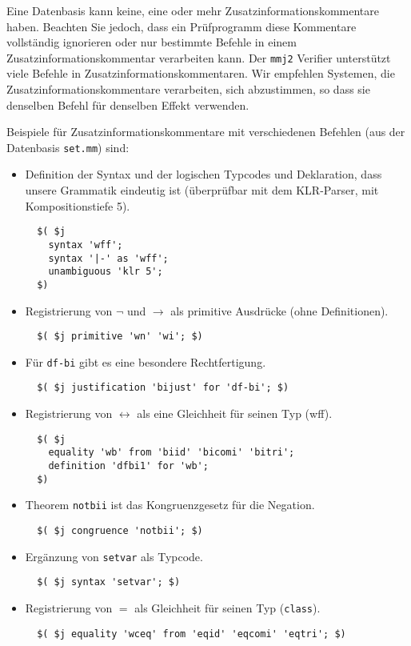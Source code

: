 Eine Datenbasis kann keine, eine oder mehr Zusatzinformationskommentare haben. Beachten Sie jedoch, dass ein Prüfprogramm diese Kommentare vollständig ignorieren oder nur bestimmte Befehle in einem Zusatzinformationskommentar verarbeiten kann. Der \texttt{mmj2} Verifier unterstützt viele Befehle in Zusatzinformationskommentaren. Wir empfehlen Systemen, die Zusatzinformationskommentare verarbeiten, sich abzustimmen, so dass sie denselben Befehl für denselben Effekt verwenden. 

Beispiele für Zusatzinformationskommentare mit verschiedenen Befehlen (aus der Datenbasis \texttt{set.mm}) sind: 

\begin{itemize}
   \item Definition der Syntax und der logischen Typcodes und Deklaration, dass unsere Grammatik eindeutig ist (überprüfbar mit dem KLR-Parser, mit Kompositionstiefe 5).
\begin{verbatim}
  $( $j
    syntax 'wff';
    syntax '|-' as 'wff';
    unambiguous 'klr 5';
  $)
\end{verbatim}

   \item Registrierung von $\lnot$ und $\rightarrow$ als primitive Ausdrücke (ohne Definitionen).
\begin{verbatim}
  $( $j primitive 'wn' 'wi'; $)
\end{verbatim}

   \item Für \texttt{df-bi} gibt es eine besondere Rechtfertigung.
\begin{verbatim}
  $( $j justification 'bijust' for 'df-bi'; $)
\end{verbatim}

   \item Registrierung von $\leftrightarrow$ als eine Gleichheit für seinen Typ (wff).
\begin{verbatim}
  $( $j
    equality 'wb' from 'biid' 'bicomi' 'bitri';
    definition 'dfbi1' for 'wb';
  $)
\end{verbatim}

   \item Theorem \texttt{notbii} ist das Kongruenzgesetz für die Negation.
\begin{verbatim}
  $( $j congruence 'notbii'; $)
\end{verbatim}

   \item Ergänzung von \texttt{setvar} als Typcode.
\begin{verbatim}
  $( $j syntax 'setvar'; $)
\end{verbatim}

   \item Registrierung von $=$ als Gleichheit für seinen Typ (\texttt{class}).
\begin{verbatim}
  $( $j equality 'wceq' from 'eqid' 'eqcomi' 'eqtri'; $)
\end{verbatim}

\end{itemize}


